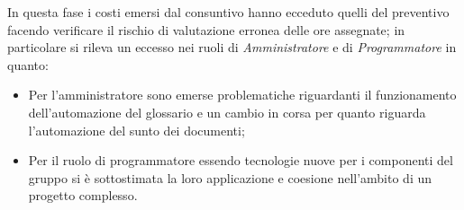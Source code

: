 \newline
In questa fase i costi emersi dal consuntivo hanno ecceduto quelli del preventivo facendo verificare il rischio di valutazione erronea delle ore assegnate; in particolare si rileva un eccesso nei ruoli di \emph{Amministratore} e di \emph{Programmatore} in quanto:
\begin{itemize}
    \item Per l'amministratore sono emerse problematiche riguardanti il funzionamento dell'automazione del glossario e un cambio in corsa per quanto riguarda l'automazione del sunto dei documenti;
    \item Per il ruolo di programmatore essendo tecnologie nuove per i componenti del gruppo si è sottostimata la loro applicazione e coesione nell'ambito di un progetto complesso.
\end{itemize}

